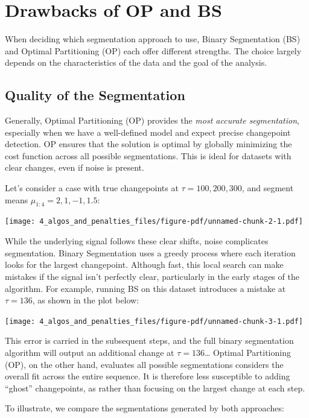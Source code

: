 \documentclass[
  letterpaper,
  DIV=11,
  numbers=noendperiod]{scrreprt}
\begin{document}
\section{Drawbacks of OP and BS}\label{drawbacks-of-op-and-bs}

When deciding which segmentation approach to use, Binary Segmentation
(BS) and Optimal Partitioning (OP) each offer different strengths. The
choice largely depends on the characteristics of the data and the goal
of the analysis.

\subsection{Quality of the
Segmentation}\label{quality-of-the-segmentation}

Generally, Optimal Partitioning (OP) provides the \emph{most accurate
segmentation}, especially when we have a well-defined model and expect
precise changepoint detection. OP ensures that the solution is optimal
by globally minimizing the cost function across all possible
segmentations. This is ideal for datasets with clear changes, even if
noise is present.

Let's consider a case with true changepoints at
\(\tau = 100, 200, 300\), and segment means
\(\mu_{1:4} = 2, 1, -1, 1.5\):

\texttt{[image: 4\_algos\_and\_penalties\_files/figure-pdf/unnamed-chunk-2-1.pdf]}

While the underlying signal follows these clear shifts, noise
complicates segmentation. Binary Segmentation uses a greedy process
where each iteration looks for the largest changepoint. Although fast,
this local search can make mistakes if the signal isn't perfectly clear,
particularly in the early stages of the algorithm. For example, running
BS on this dataset introduces a mistake at \(\tau = 136\), as shown in
the plot below:

\texttt{[image: 4\_algos\_and\_penalties\_files/figure-pdf/unnamed-chunk-3-1.pdf]}

This error is carried in the subsequent steps, and the full binary
segmentation algorithm will output an additional change at
\(\tau = 136\)\ldots{} Optimal Partitioning (OP), on the other hand,
evaluates all possible segmentations considers the overall fit across
the entire sequence. It is therefore less susceptible to adding
``ghost'' changepoints, as rather than focusing on the largest change at
each step.

To illustrate, we compare the segmentations generated by both
approaches:
\end{document}
